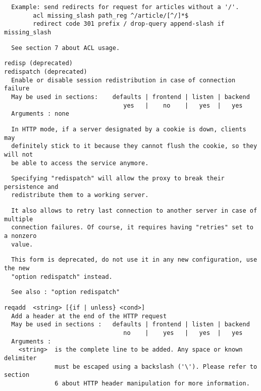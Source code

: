 \begin{verbatim}
  Example: send redirects for request for articles without a '/'.
        acl missing_slash path_reg ^/article/[^/]*$
        redirect code 301 prefix / drop-query append-slash if missing_slash
\end{verbatim}

\begin{verbatim}
  See section 7 about ACL usage.
\end{verbatim}

\begin{verbatim}
redisp (deprecated)
redispatch (deprecated)
  Enable or disable session redistribution in case of connection failure
  May be used in sections:    defaults | frontend | listen | backend
                                 yes   |    no    |   yes  |   yes
  Arguments : none
\end{verbatim}

\begin{verbatim}
  In HTTP mode, if a server designated by a cookie is down, clients may
  definitely stick to it because they cannot flush the cookie, so they will not
  be able to access the service anymore.
\end{verbatim}

\begin{verbatim}
  Specifying "redispatch" will allow the proxy to break their persistence and
  redistribute them to a working server.
\end{verbatim}

\begin{verbatim}
  It also allows to retry last connection to another server in case of multiple
  connection failures. Of course, it requires having "retries" set to a nonzero
  value.
\end{verbatim}

\begin{verbatim}
  This form is deprecated, do not use it in any new configuration, use the new
  "option redispatch" instead.
\end{verbatim}

\begin{verbatim}
  See also : "option redispatch"
\end{verbatim}

\begin{verbatim}
reqadd  <string> [{if | unless} <cond>]
  Add a header at the end of the HTTP request
  May be used in sections :   defaults | frontend | listen | backend
                                 no    |    yes   |   yes  |   yes
  Arguments :
    <string>  is the complete line to be added. Any space or known delimiter
              must be escaped using a backslash ('\'). Please refer to section
              6 about HTTP header manipulation for more information.
\end{verbatim}

